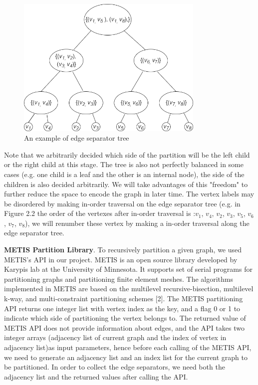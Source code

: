 \documentclass[12pt,glossary]{dalthesis}
\begin{document}
\begin{figure}[ht]
\centering
\includegraphics[width=0.8\textwidth]{separatorTree}
\caption{An example of edge separator tree}
\end{figure}

\bigskip
\bigskip
Note that we arbitrarily decided which side of the partition will be the left child or the right child at this stage. The tree is also not perfectly balanced in some cases (e.g. one child is a leaf and the other is an internal node), the side of the children is also decided arbitrarily. We will take advantages of this "freedom" to further reduce the space to encode the graph in later time. The vertex labels may be disordered by making in-order traversal on the edge separator tree (e.g. in Figure 2.2 the order of the vertexes after in-order traversal is :$v_{1}$, $v_{4}$, $v_{2}$, $v_{3}$, $v_{5}$, $v_{6}$, $v_{7}$, $v_{8}$), we will renumber these vertex by making a in-order traversal along the edge separator tree.

\bigskip
\bigskip

\textbf{METIS Partition Library}. To recursively partition a given graph, we used METIS's API in our project. METIS is an open source library developed by Karypis lab at the University of Minnesota. It supports set of serial programs for partitioning graphs and partitioning finite element meshes. The algorithms implemented in METIS are based on the multilevel recursive-bisection, multilevel k-way, and multi-constraint partitioning schemes [2]. The METIS partitioning API returns one integer list with vertex index as the key, and a flag 0 or 1 to indicate which side of partitioning the vertex belongs to. The returned value of METIS API does not provide information about edges, and the API takes two integer arrays (adjacency list of current graph and the index of vertex in adjacency list)as input parameters, hence before each calling of the METIS API, we need to generate an adjacency list and an index list for the current graph to be partitioned. In order to collect the edge separators, we need both the adjacency list and the returned values after calling the API.
\end{document}
